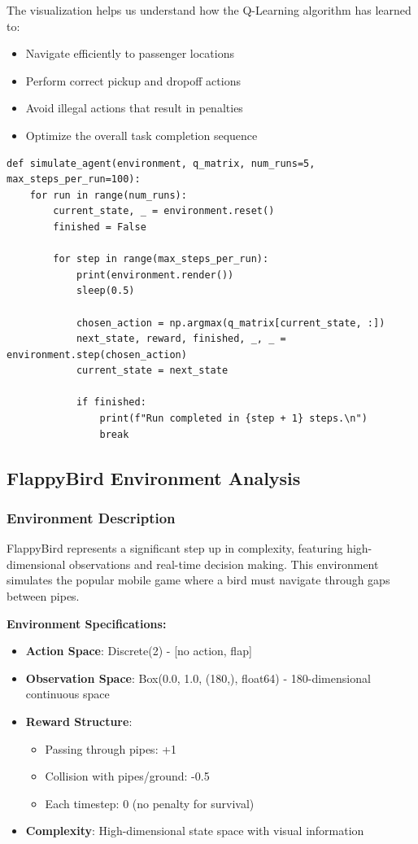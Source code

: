 \documentclass[12pt]{article}
\begin{document}
{{{The visualization helps us understand how the Q-Learning algorithm has learned to:
\begin{itemize}
    \item Navigate efficiently to passenger locations
    \item Perform correct pickup and dropoff actions
    \item Avoid illegal actions that result in penalties
    \item Optimize the overall task completion sequence
\end{itemize}

\begin{verbatim}
def simulate_agent(environment, q_matrix, num_runs=5, max_steps_per_run=100):
    for run in range(num_runs):
        current_state, _ = environment.reset()
        finished = False
        
        for step in range(max_steps_per_run):            
            print(environment.render())
            sleep(0.5)  
            
            chosen_action = np.argmax(q_matrix[current_state, :])
            next_state, reward, finished, _, _ = environment.step(chosen_action)
            current_state = next_state

            if finished:
                print(f"Run completed in {step + 1} steps.\n")
                break
\end{verbatim}

\subsection{FlappyBird Environment Analysis}

\subsubsection{Environment Description}

FlappyBird represents a significant step up in complexity, featuring high-dimensional observations and real-time decision making. This environment simulates the popular mobile game where a bird must navigate through gaps between pipes.

\textbf{Environment Specifications:}
\begin{itemize}
    \item \textbf{Action Space}: Discrete(2) - [no action, flap]
    \item \textbf{Observation Space}: Box(0.0, 1.0, (180,), float64) - 180-dimensional continuous space
    \item \textbf{Reward Structure}:
        \begin{itemize}
            \item Passing through pipes: +1
            \item Collision with pipes/ground: -0.5
            \item Each timestep: 0 (no penalty for survival)
        \end{itemize}
    \item \textbf{Complexity}: High-dimensional state space with visual information
\end{itemize}

}}}
\end{document}
